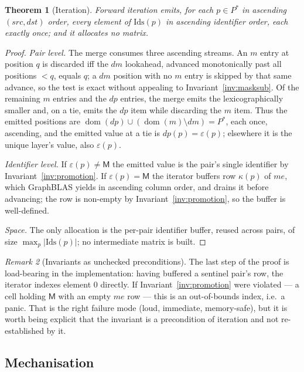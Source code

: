 \documentclass[11pt,a4paper]{article}
\theoremstyle{plain}
\newtheorem{theorem}{Theorem}
\theoremstyle{definition}
\theoremstyle{remark}
\newtheorem{remark}[theorem]{Remark}
\newcommand{\M}{\mathsf{M}}
\newcommand{\dom}{\operatorname{dom}}
\begin{document}
\begin{theorem}[Iteration]
\label{thm:iter}
Forward iteration emits, for each $p \in P^{\ast}$ in ascending
$(\mathit{src},\mathit{dst})$ order, every element of $\mathrm{Ids}(p)$ in
ascending identifier order, each exactly once; and it allocates no matrix.
\end{theorem}

\begin{proof}
\emph{Pair level.} The merge consumes three ascending streams. An $m$ entry at
position $q$ is discarded iff the $dm$ lookahead, advanced monotonically past
all positions $< q$, equals $q$; a $dm$ position with no $m$ entry is skipped
by that same advance, so the test is exact without appealing to
Invariant~\ref{inv:masksub}. Of the remaining $m$ entries and the $dp$ entries, the merge emits
the lexicographically smaller and, on a tie, emits the $dp$ item while
discarding the $m$ item. Thus the emitted positions are
$\dom(dp) \cup (\dom(m)\setminus dm) = P^{\ast}$, each once, ascending, and the
emitted value at a tie is $dp(p) = \varepsilon(p)$; elsewhere it is the unique
layer's value, also $\varepsilon(p)$.

\emph{Identifier level.} If $\varepsilon(p) \neq \M$ the emitted value is the
pair's single identifier by Invariant~\ref{inv:promotion}. If
$\varepsilon(p) = \M$ the iterator buffers row $\kappa(p)$ of $me$, which
GraphBLAS yields in ascending column order, and drains it before advancing;
the row is non-empty by Invariant~\ref{inv:promotion}, so the buffer is
well-defined.

\emph{Space.} The only allocation is the per-pair identifier buffer, reused
across pairs, of size $\max_p |\mathrm{Ids}(p)|$; no intermediate matrix is
built.
\end{proof}

\begin{remark}[Invariants as unchecked preconditions]
The last step of the proof is load-bearing in the implementation: having
buffered a sentinel pair's row, the iterator indexes element $0$ directly. If
Invariant~\ref{inv:promotion} were violated --- a cell holding $\M$ with an
empty $me$ row --- this is an out-of-bounds index, i.e.\ a panic. That is the
right failure mode (loud, immediate, memory-safe), but it is worth being
explicit that the invariant is a precondition of iteration and not
re-established by it.
\end{remark}

\subsection{Mechanisation}
\label{sec:mechanised}
\end{document}
